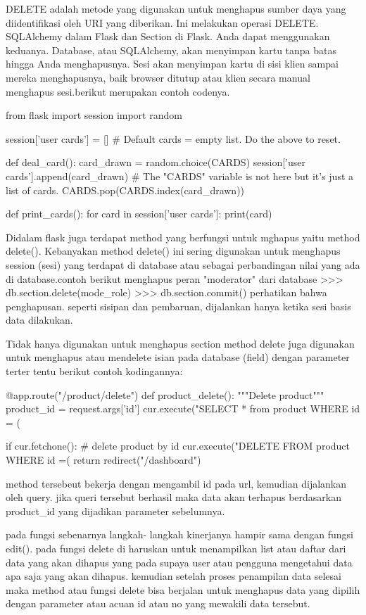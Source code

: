 DELETE adalah metode yang digunakan untuk menghapus sumber daya yang diidentifikasi oleh URI yang diberikan. Ini melakukan operasi DELETE\cite{alemu2014rest}.
SQLAlchemy dalam Flask dan Section di Flask. Anda dapat menggunakan keduanya. Database, atau SQLAlchemy, akan menyimpan kartu tanpa batas hingga Anda menghapusnya. Sesi akan menyimpan kartu di sisi klien sampai mereka menghapusnya, baik browser ditutup atau klien secara manual menghapus sesi.berikut merupakan contoh codenya.

from flask import session
import random

session['user cards'] = []
# Default cards = empty list. Do the above to reset.

def deal_card():
  card_drawn = random.choice(CARDS)
  session['user cards'].append(card_drawn)
  # The "CARDS" variable is not here but it's just a list of cards.
  CARDS.pop(CARDS.index(card_drawn))

def print_cards():
  for card in session['user cards']:
    print(card)

Didalam flask juga terdapat method yang berfungsi untuk mghapus yaitu method delete(). Kebanyakan method delete() ini sering digunakan untuk menghapus session (sesi) yang terdapat di database atau sebagai perbandingan nilai yang ada di database.contoh berikut menghapus peran "moderator" dari database
>>> db.section.delete(mode_role)
>>> db.section.commit()
perhatikan bahwa penghapusan. seperti sisipan dan pembaruan, dijalankan hanya ketika sesi basis data dilakukan\cite{grinberg2018flask}.

Tidak hanya digunakan untuk menghapus section method delete juga digunakan untuk menghapus atau mendelete isian pada 
database (field) dengan parameter terter tentu berikut contoh kodingannya:

@app.route("/product/delete")
def product_delete():
    """Delete product"""
    product_id = request.args['id']
    cur.execute("SELECT * from product WHERE id = (%

    if cur.fetchone():
        # delete product by id
        cur.execute("DELETE FROM product WHERE id =(%
    return redirect("/dashboard")

method tersebeut bekerja dengan mengambil id pada url, kemudian dijalankan oleh query. jika queri tersebut berhasil maka
data akan terhapus berdasarkan product_id yang dijadikan parameter sebelumnya.

pada fungsi sebenarnya langkah- langkah kinerjanya hampir sama dengan fungsi edit().
pada fungsi delete di haruskan untuk menampilkan list atau daftar dari data yang akan dihapus
yang pada supaya user atau pengguna mengetahui data apa saja yang akan dihapus. kemudian 
setelah proses penampilan data selesai maka method atau fungsi delete bisa berjalan untuk menghapus data 
yang dipilih dengan parameter atau acuan id atau no yang mewakili data tersebut.

